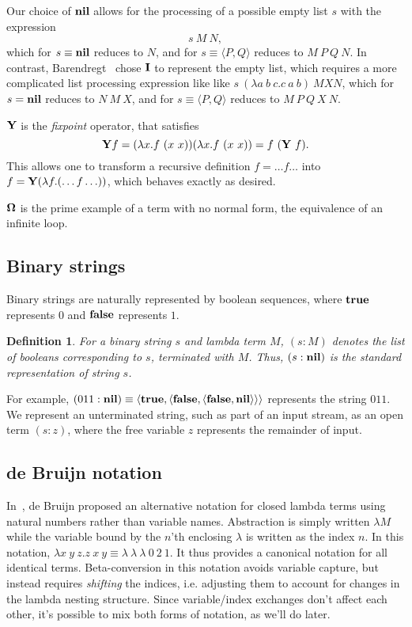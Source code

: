 \documentclass{article}
\newtheorem{definition}{Definition}
\newcommand{\tup}[1]{\langle #1 \rangle}
\newcommand{\pref}[2]{(#1:#2)}
\newcommand{\Ct}{{\bf true}}
\newcommand{\Cf}{{\bf false}}
\newcommand{\CY}{{\bf Y}}
\newcommand{\CI}{{\bf I}}
\newcommand{\COm}{{\bf \Omega}}
\newcommand{\Cnil}{{\bf nil}}
\newcommand{\Cnull}{{\bf null}}
\begin{document}
Our choice of $\Cnil$ allows for the processing
of a possible empty list $s$ with the expression
\[ s\ M\  N, \]
which for $s\equiv \Cnil$ reduces to $N$, and for
$s\equiv \tup{P,Q}$ reduces to $M\ P\ Q\ N$.
In contrast, Barendregt~\cite{baay} chose $\CI$ to represent the empty list,
which requires a more complicated list processing expression like
like $s\ (\lambda a\ b\ c.c\ a\ b)\ M X N$,
which for $s= \Cnil$ reduces to $N\ M\ X$, and for
$s\equiv \tup{P,Q}$ reduces to $M\ P\ Q\ X\ N$.

$\CY$ is the {\em fixpoint} operator, that
satisfies \[\CY f = (\lambda x.f\ (x\ x))(\lambda x.f\ (x\ x)) = f\ (\CY\ f).\]
This allows one to transform a recursive definition $f= \ldots f \ldots$
into $f = \CY(\lambda f. (\ldots f \ldots))$, which behaves exactly as desired.

$\COm$ is the prime example of a term with no normal form, the equivalence
of an infinite loop.

\subsection{Binary strings}
Binary strings are naturally represented by boolean sequences,
where $\Ct$ represents $0$ and $\Cf$ represents $1$.
\begin{definition}
For a binary string $s$ and lambda term $M$, $\pref{s}{M}$ denotes the
list of booleans corresponding to $s$, terminated with $M$.
Thus, $\pref{s}{\Cnil}$ is the standard representation of string $s$.
\end{definition}
For example, $\pref{011}{\Cnil} \equiv \tup{\Ct,\tup{\Cf,\tup{\Cf,\Cnil}}}$
represents the string $011$.
We represent an unterminated string, such as part of an input stream,
as an open term $\pref{s}{z}$, where the free variable $z$ represents
the remainder of input.

\subsection{de Bruijn notation}
In~\cite{bruijn}, de Bruijn proposed an alternative notation for closed
lambda terms using natural numbers rather than variable names.
Abstraction is simply written
$\lambda M$ while the variable bound by the $n$'th enclosing
$\lambda$ is written as the index $n$. In this notation,
$\lambda x\ y\ z.z\ x\ y \equiv \lambda\ \lambda\ \lambda\ 0\ 2\ 1$.
It thus provides a canonical notation for all identical terms.
Beta-conversion in this notation avoids variable capture,
but instead requires {\em shifting} the indices, i.e. adjusting them
to account for changes in the lambda nesting structure.
Since variable/index exchanges don't affect each other,
it's possible to mix both forms of notation, as we'll do later.
\end{document}

